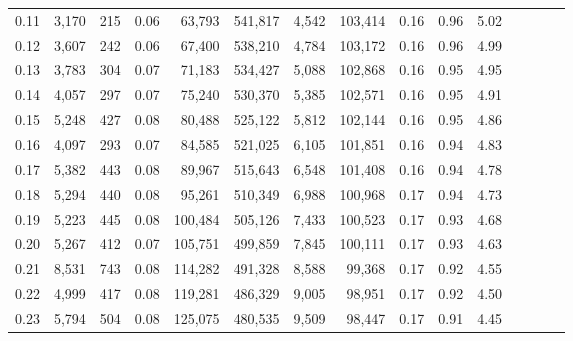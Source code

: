 \begin{tabular}{rrrcrrrrrrrrrrr}
0.11 &   3,170 &    215 &                                       0.06 &   63,793 &  541,817 &    4,542 &  103,414 &  0.16 &  0.96 &                         5.02 \\
0.12 &   3,607 &    242 &                                       0.06 &   67,400 &  538,210 &    4,784 &  103,172 &  0.16 &  0.96 &                         4.99 \\
0.13 &   3,783 &    304 &                                       0.07 &   71,183 &  534,427 &    5,088 &  102,868 &  0.16 &  0.95 &                         4.95 \\
0.14 &   4,057 &    297 &                                       0.07 &   75,240 &  530,370 &    5,385 &  102,571 &  0.16 &  0.95 &                         4.91 \\
0.15 &   5,248 &    427 &                                       0.08 &   80,488 &  525,122 &    5,812 &  102,144 &  0.16 &  0.95 &                         4.86 \\
0.16 &   4,097 &    293 &                                       0.07 &   84,585 &  521,025 &    6,105 &  101,851 &  0.16 &  0.94 &                         4.83 \\
0.17 &   5,382 &    443 &                                       0.08 &   89,967 &  515,643 &    6,548 &  101,408 &  0.16 &  0.94 &                         4.78 \\
0.18 &   5,294 &    440 &                                       0.08 &   95,261 &  510,349 &    6,988 &  100,968 &  0.17 &  0.94 &                         4.73 \\
0.19 &   5,223 &    445 &                                       0.08 &  100,484 &  505,126 &    7,433 &  100,523 &  0.17 &  0.93 &                         4.68 \\
0.20 &   5,267 &    412 &                                       0.07 &  105,751 &  499,859 &    7,845 &  100,111 &  0.17 &  0.93 &                         4.63 \\
0.21 &   8,531 &    743 &                                       0.08 &  114,282 &  491,328 &    8,588 &   99,368 &  0.17 &  0.92 &                         4.55 \\
0.22 &   4,999 &    417 &                                       0.08 &  119,281 &  486,329 &    9,005 &   98,951 &  0.17 &  0.92 &                         4.50 \\
0.23 &   5,794 &    504 &                                       0.08 &  125,075 &  480,535 &    9,509 &   98,447 &  0.17 &  0.91 &                         4.45 \\

\end{tabular}
